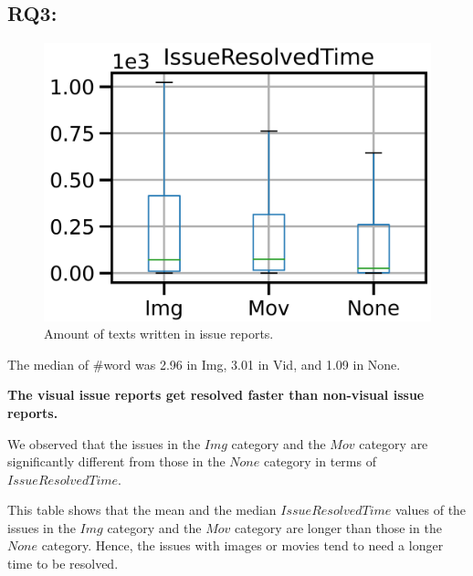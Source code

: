 \subsection*{RQ3: \RQthree{}}
\begin{figure}[t]
    \centering
    \includegraphics[width=0.5\linewidth]{./figures/fixes.png}
    \caption{Amount of texts written in issue reports. }
    \label{fig:words}
\end{figure}
The median of \#word was 2.96 in Img, 3.01 in Vid, and 1.09 in None.

\textbf{The visual issue reports get resolved faster than non-visual issue reports. }

We observed that the issues in the $Img$ category and 
the $Mov$ category are significantly different from those 
in the $None$ category in terms of $IssueResolvedTime$. 

This table shows that 
the mean and the median $IssueResolvedTime$ values of 
the issues in the $Img$ category and the $Mov$ category are 
longer than those in the $None$ category. 
Hence, the issues with images or movies tend to need 
a longer time to be resolved. 

